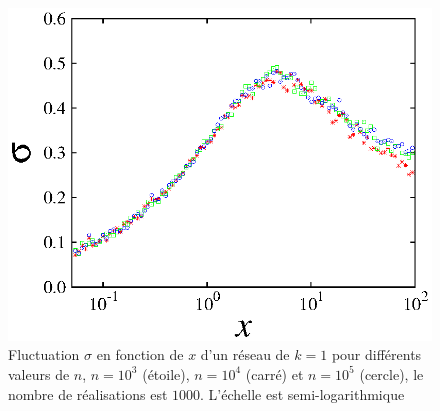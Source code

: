 \begin{figure}[h!]
	\centering
	\includegraphics[scale=1,angle=0]{./figures/fluct}
	\caption{Fluctuation $\sigma$ en fonction de $x$ d'un réseau de $k=1$  pour différents valeurs de $n$, $n=10^3$ (étoile), $n=10^4$ (carré) et $n=10^5$ (cercle), le nombre de réalisations est $1000$. L'échelle est semi-logarithmique}
	\label{fluct}
\end{figure}
